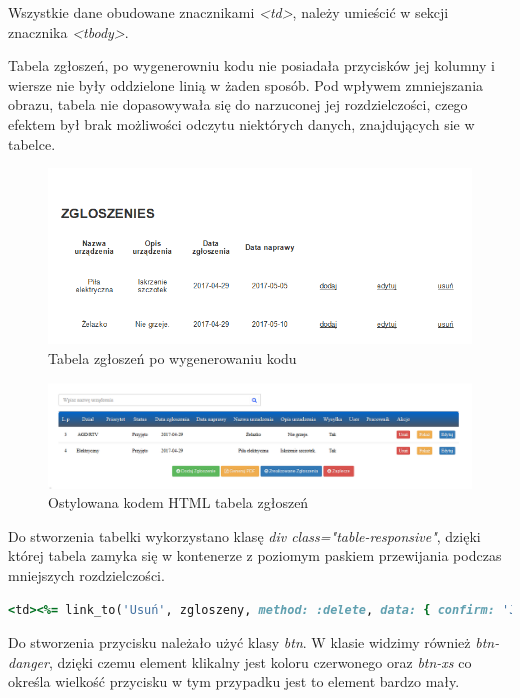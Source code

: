 \documentclass[openright]{xmgr}
\begin{document}
	Wszystkie dane obudowane znacznikami \textit{<td>}, należy umieścić w sekcji znacznika \textit{<tbody>}.  
	
	Tabela zgłoszeń, po wygenerowniu kodu nie posiadała przycisków jej kolumny i wiersze nie były oddzielone linią w żaden sposób. Pod wpływem zmniejszania obrazu, tabela nie dopasowywała się do narzuconej jej rozdzielczości, czego efektem był brak możliwości odczytu niektórych danych, znajdujących sie w tabelce. 
	
	\begin{figure}[!tbh]
		\centering
		\includegraphics[width=\linewidth]{image/zgloszenie}
		\caption{Tabela zgłoszeń po wygenerowaniu kodu}
	\end{figure}
\newpage	
	\begin{figure}[!tbh]
		\centering
		\includegraphics[width=\linewidth]{image/tabelka}
		\caption{Ostylowana kodem HTML tabela zgłoszeń}
	\end{figure}
	
	Do stworzenia tabelki wykorzystano klasę \textit{div class="table-responsive"}, dzięki której tabela zamyka się w kontenerze z poziomym paskiem przewijania podczas mniejszych rozdzielczości.
	
	\begin{lstlisting}[language=Ruby,lineskip={-1pt},caption=Element klikalny]
	<td><%= link_to('Usuń', zgloszeny, method: :delete, data: { confirm: 'Jesteś pewny?' }, class:'btn btn-danger btn-xs') %></td>
	\end{lstlisting}
	
	Do stworzenia przycisku należało użyć klasy \textit{btn}. W klasie widzimy również \textit{btn-danger}, dzięki czemu element klikalny jest koloru czerwonego oraz \textit{btn-xs} co określa wielkość przycisku w tym przypadku jest to element bardzo mały. 
	
\end{document}
